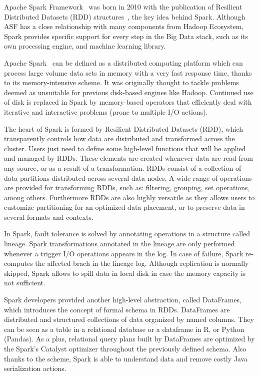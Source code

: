 \documentclass[3p,review]{elsarticle}
\begin{document}
Apache Spark Framework~\cite{spark} was born in 2010 with the publication of Resilient Distributed Datasets (RDD) structures~\cite{zaharia12}, the key idea behind Spark. Although ASF has a close relationship with many components from Hadoop Ecosystem, Spark provides specific support for every step in the Big Data stack, such as its own processing engine, and machine learning library. 

Apache Spark~\cite{hamstra15} can be defined as a distributed computing platform which can process large volume data sets in memory with a very fast response time, thanks to its memory-intensive scheme. It was originally thought to tackle problems deemed as unsuitable for previous disk-based engines like Hadoop. Continued use of disk is replaced in Spark by memory-based operators that efficiently deal with iterative and interactive problems (prone to multiple I/O actions). 

The heart of Spark is formed by Resilient Distributed Datasets (RDD), which transparently controls how data are distributed and transformed across the cluster. Users just need to define some high-level functions that will be applied and managed by RDDs. These elements are created whenever data are read from any source, or as a result of a transformation. RDDs consist of a collection of data partitions distributed across several data nodes. A wide range of operations are provided for transforming RDDs, such as: filtering, grouping, set operations, among others. Furthermore RDDs are also highly versatile as they allows users to customize partitioning for an optimized data placement, or to preserve data in several formats and contexts.

In Spark, fault tolerance is solved by annotating operations in a structure called lineage. Spark transformations annotated in the lineage are only performed whenever a trigger I/O operations appears in the log. In case of failure, Spark re-computes the affected brach in the lineage log. Although replication is normally skipped, Spark allows to spill data in local disk in case the memory capacity is not sufficient. 

Spark developers provided another high-level abstraction, called DataFrames, which introduces the concept of formal schema in RDDs. DataFrames are distributed and structured collections of data organized by named columns. They can be seen as a table in a relational database or a dataframe in R, or Python (Pandas). As a plus, relational query plans built by DataFrames are optimized by the Spark's Catalyst optimizer throughout the previously defined schema. Also thanks to the scheme, Spark is able to understand data and remove costly Java serialization actions.
\end{document}
